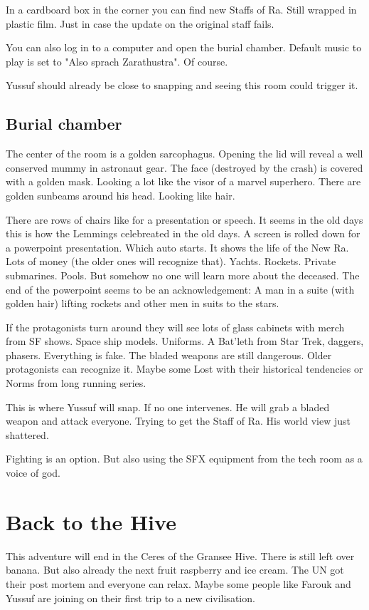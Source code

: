 In a cardboard box in the corner you can find new Staffs of Ra. Still wrapped in plastic film. Just in case the update on the original staff fails.

You can also log in to a computer and open the burial chamber. Default music to play is set to "Also sprach Zarathustra". Of course.

Yussuf should already be close to snapping and seeing this room could trigger it.

\subsection{Burial chamber}

The center of the room is a golden sarcophagus. Opening the lid will reveal a well conserved mummy in astronaut gear. The face (destroyed by the crash) is covered with a golden mask. Looking a lot like the visor of a marvel superhero. There are golden sunbeams around his head. Looking like hair.

There are rows of chairs like for a presentation or speech. It seems in the old days this is how the Lemmings celebreated in the old days. A screen is rolled down for a powerpoint presentation. Which auto starts.
It shows the life of the New Ra. Lots of money (the older ones will recognize that). Yachts. Rockets. Private submarines. Pools. But somehow no one will learn more about the deceased.
The end of the powerpoint seems to be an acknowledgement: A man in a suite (with golden hair) lifting rockets and other men in suits to the stars.

If the protagonists turn around they will see lots of glass cabinets with merch from SF shows. Space ship models. Uniforms. A Bat'leth from Star Trek, daggers, phasers. Everything is fake. The bladed weapons are still dangerous. Older protagonists can recognize it. Maybe some Lost with their historical tendencies or Norms from long running series.

This is where Yussuf will snap. If no one intervenes. He will grab a bladed weapon and attack everyone. Trying to get the Staff of Ra. His world view just shattered.

Fighting is an option. But also using the SFX equipment from the tech room as a voice of god.

\section{Back to the Hive}

This adventure will end in the Ceres of the Gransee Hive. There is still left over banana. But also already the next fruit raspberry and ice cream. The UN got their post mortem and everyone can relax. Maybe some people like Farouk and Yussuf are joining on their first trip to a new civilisation.

